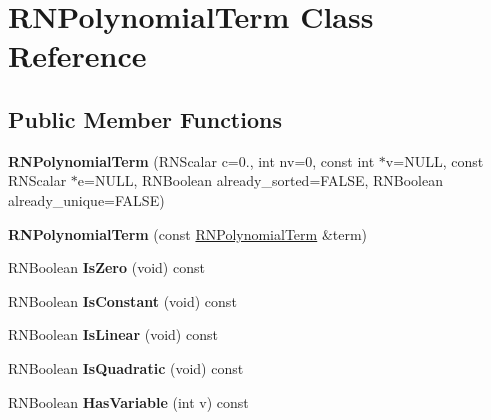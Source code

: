 \hypertarget{class_r_n_polynomial_term}{}\section{R\+N\+Polynomial\+Term Class Reference}
\label{class_r_n_polynomial_term}
\subsection*{Public Member Functions}
\begin{DoxyCompactItemize}
\item 
{\bfseries R\+N\+Polynomial\+Term} (R\+N\+Scalar c=0., int nv=0, const int $\ast$v=N\+U\+LL, const R\+N\+Scalar $\ast$e=N\+U\+LL, R\+N\+Boolean already\+\_\+sorted=F\+A\+L\+SE, R\+N\+Boolean already\+\_\+unique=F\+A\+L\+SE)\hypertarget{class_r_n_polynomial_term_ae2007aaae34f0a08fd8c2f09cf7ae6cf}{}\label{class_r_n_polynomial_term_ae2007aaae34f0a08fd8c2f09cf7ae6cf}

\item 
{\bfseries R\+N\+Polynomial\+Term} (const \hyperlink{class_r_n_polynomial_term}{R\+N\+Polynomial\+Term} \&term)\hypertarget{class_r_n_polynomial_term_a15c1d07880989957dbf9f218e301f5f2}{}\label{class_r_n_polynomial_term_a15c1d07880989957dbf9f218e301f5f2}

\item 
R\+N\+Boolean {\bfseries Is\+Zero} (void) const \hypertarget{class_r_n_polynomial_term_af3401c01758d8db97830d565f0dba071}{}\label{class_r_n_polynomial_term_af3401c01758d8db97830d565f0dba071}

\item 
R\+N\+Boolean {\bfseries Is\+Constant} (void) const \hypertarget{class_r_n_polynomial_term_ae68a3196bb54b68ef5537eba66ca87b4}{}\label{class_r_n_polynomial_term_ae68a3196bb54b68ef5537eba66ca87b4}

\item 
R\+N\+Boolean {\bfseries Is\+Linear} (void) const \hypertarget{class_r_n_polynomial_term_af677f357910ebb64d34237ccfb4b354b}{}\label{class_r_n_polynomial_term_af677f357910ebb64d34237ccfb4b354b}

\item 
R\+N\+Boolean {\bfseries Is\+Quadratic} (void) const \hypertarget{class_r_n_polynomial_term_ae093dac52f1e1baee8a1afdbbe4ea732}{}\label{class_r_n_polynomial_term_ae093dac52f1e1baee8a1afdbbe4ea732}

\item 
R\+N\+Boolean {\bfseries Has\+Variable} (int v) const \hypertarget{class_r_n_polynomial_term_a5ed39e13e34819eb0ff0dae365497044}{}\label{class_r_n_polynomial_term_a5ed39e13e34819eb0ff0dae365497044}


\end{DoxyCompactItemize}
